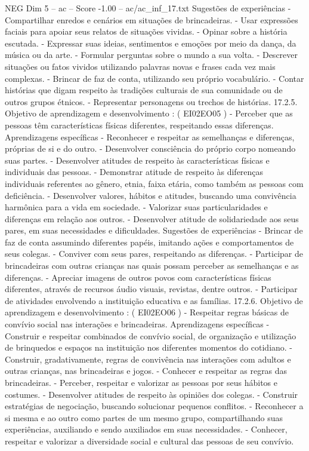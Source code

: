 \begin{textsample}{NEG Dim 5 – ac – Score -1.00 – ac/ac\_inf\_17.txt}
Sugestões de experiências - Compartilhar enredos e cenários em situações de brincadeiras. - Usar expressões faciais para apoiar seus relatos de situações vividas. - Opinar sobre a história escutada. - Expressar suas ideias, sentimentos e emoções por meio da dança, da música ou da arte. - Formular perguntas sobre o mundo a sua volta. - Descrever situações ou fatos vividos utilizando palavras novas e frases cada vez mais complexas. - Brincar de faz de conta, utilizando seu próprio vocabulário. - Contar histórias que digam respeito às tradições culturais de sua comunidade ou de outros grupos étnicos. - Representar personagens ou trechos de histórias. 17.2.5.
Objetivo de aprendizagem e desenvolvimento : ( EI02EO05 ) - Perceber que as pessoas têm características físicas diferentes, respeitando essas diferenças.
Aprendizagens específicas - Reconhecer e respeitar as semelhanças e diferenças, próprias de si e do outro. - Desenvolver consciência do próprio corpo nomeando suas partes. - Desenvolver atitudes de respeito às características físicas e individuais das pessoas. - Demonstrar atitude de respeito às diferenças individuais referentes ao gênero, etnia, faixa etária, como também as pessoas com deficiência. - Desenvolver valores, hábitos e atitudes, buscando uma convivência harmônica para a vida em sociedade. - Valorizar suas particularidades e diferenças em relação aos outros. - Desenvolver atitude de solidariedade aos seus pares, em suas necessidades e dificuldades.
Sugestões de experiências - Brincar de faz de conta assumindo diferentes papéis, imitando ações e comportamentos de seus colegas. - Conviver com seus pares, respeitando as diferenças. - Participar de brincadeiras com outras crianças nas quais possam perceber as semelhanças e as diferenças. - Apreciar imagens de outros povos com características físicas diferentes, através de recursos áudio visuais, revistas, dentre outros. - Participar de atividades envolvendo a instituição educativa e as famílias. 17.2.6.
Objetivo de aprendizagem e desenvolvimento : ( EI02EO06 ) - Respeitar regras básicas de convívio social nas interações e brincadeiras.
Aprendizagens específicas - Construir e respeitar combinados de convívio social, de organização e utilização de brinquedos e espaços na instituição nos diferentes momentos do cotidiano. - Construir, gradativamente, regras de convivência nas interações com adultos e outras crianças, nas brincadeiras e jogos. - Conhecer e respeitar as regras das brincadeiras. - Perceber, respeitar e valorizar as pessoas por seus hábitos e costumes. - Desenvolver atitudes de respeito às opiniões dos colegas. - Construir estratégias de negociação, buscando solucionar pequenos conflitos. - Reconhecer a si mesma e ao outro como partes de um mesmo grupo, compartilhando suas experiências, auxiliando e sendo auxiliados em suas necessidades. - Conhecer, respeitar e valorizar a diversidade social e cultural das pessoas de seu convívio.

\end{textsample}
